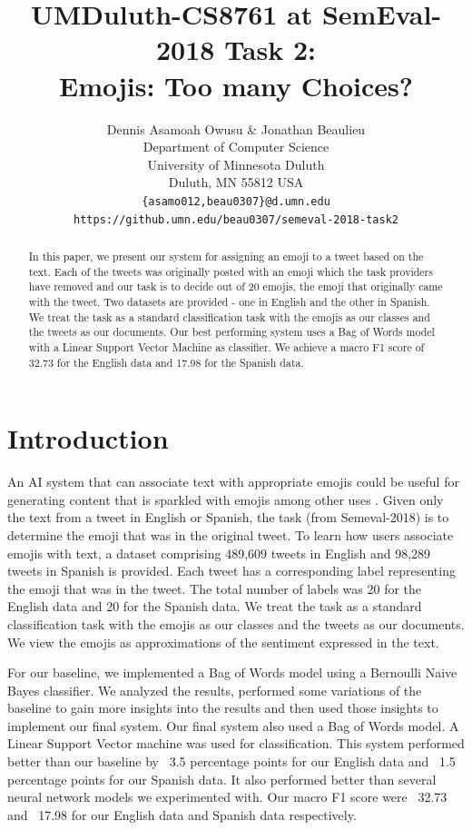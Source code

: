 \documentclass[11pt,a4paper]{article}
\title{UMDuluth-CS8761 at SemEval-2018 Task 2:\\
Emojis: Too many Choices? \winksmile}
\author{
  Dennis Asamoah Owusu \& Jonathan Beaulieu \\
  Department of Computer Science \\
  University of Minnesota Duluth \\
  Duluth, MN 55812 USA \\
  {\tt \{asamo012,beau0307\}@d.umn.edu} \\
  {\tt https://github.umn.edu/beau0307/semeval-2018-task2} \\
}
\date{}
\begin{document}
\maketitle
\begin{abstract}
In this paper, we present our system for assigning an emoji to a tweet based on the text. Each of the tweets was originally posted with an emoji which the task providers have removed and our task is to decide out of 20 emojis, the emoji that originally came with the tweet. Two datasets are provided - one in English and the other in Spanish. We treat the task as a standard classification task with the emojis as our classes and the tweets as our documents. Our best performing system uses a Bag of Words model with a Linear Support Vector Machine as classifier. We achieve a macro F1 score of 32.73 for the English data and 17.98 for the Spanish data.
   
\end{abstract}

\section{Introduction}

An AI system that can associate text with appropriate emojis could be useful for generating content that is sparkled with emojis among other uses \cite{Barb:17}. Given only the text from a tweet in English or Spanish, the task (from Semeval-2018) is to determine the emoji that was in the original tweet. To learn how users associate emojis with text, a dataset comprising 489,609 tweets in English and 98,289 tweets in Spanish is provided. Each tweet has a corresponding label representing the emoji that was in the tweet. The total number of labels was 20 for the English data and 20 for the Spanish data. We treat the task as a standard classification task with the emojis as our classes and the tweets as our documents. We view the emojis as approximations of the sentiment expressed in the text. 

For our baseline, we implemented a Bag of Words model using a Bernoulli Naive Bayes classifier. We analyzed the results, performed some variations of the baseline to gain more insights into the results and then used those insights to implement our final system. Our final system also used a Bag of Words model. A Linear Support Vector machine was used for classification. This system performed better than our baseline by ~3.5 percentage points for our English data and ~1.5 percentage points for our Spanish data. It also performed better than several neural network models we experimented with. Our macro F1 score were ~32.73 and ~17.98 for our English data and Spanish data respectively.
\end{document}
